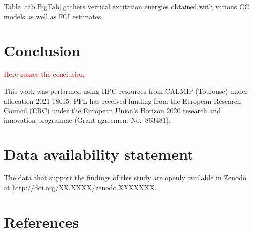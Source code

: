 \documentclass[aip,jcp,reprint,noshowkeys,superscriptaddress]{revtex4-1}
\newcommand{\titou}[1]{\textcolor{red}{#1}}
\begin{document}

Table \ref{tab:BigTab} gathers vertical excitation energies obtained with various CC models as well as FCI estimates.

\section{Conclusion}

\titou{Here comes the conclusion.}

\begin{acknowledgements}
This work was performed using HPC resources from CALMIP (Toulouse) under allocation 2021-18005.
PFL has received funding from the European Research Council (ERC) under the European Union's Horizon 2020 research and innovation programme (Grant agreement No.~863481).
\end{acknowledgements}

\section*{Data availability statement}
The data that support the findings of this study are openly available in Zenodo at \href{http://doi.org/XX.XXXX/zenodo.XXXXXXX}{http://doi.org/XX.XXXX/zenodo.XXXXXXX}.

\section*{References}

\end{document}
